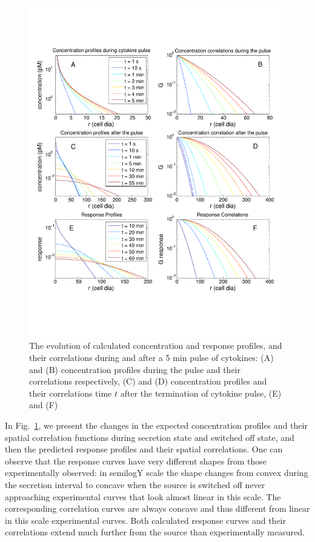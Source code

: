 \documentclass[11pt, oneside]{article}   	%
\begin{document}
\begin{figure}[h!]
	\centering
		\includegraphics[width = 6 in]{TimeDependentProfilesPulse.pdf}
		\caption{\label{Fig:10min secr} The evolution of calculated concentration and response profiles, and their correlations during and after a 5 min pulse  of cytokines: (A) and (B) concentration profiles during the pulse and their correlations respectively, (C) and (D) concentration profiles and their correlations time $t$ after the termination of cytokine pulse, (E) and (F)}
\end{figure}

In Fig.~\ref{Fig:10min secr}, we present the changes in the expected concentration  profiles and their spatial correlation functions during secretion state and switched off state, and then the predicted response profiles and their spatial correlations. One can observe that the response curves have very different shapes from those experimentally observed: in semilogY scale the shape changes from convex during the secretion interval to concave when the source is switched off never approaching experimental curves that look almost linear in this scale. The corresponding correlation curves are always concave and thus different from linear in this scale  experimental curves. Both calculated response curves and their correlations extend much further from the source than experimentally measured.
\end{document}
